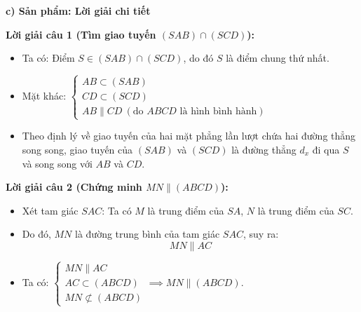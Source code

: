 \documentclass[12pt, a4paper]{article}
\begin{document}
\noindent \textbf{c) Sản phẩm: Lời giải chi tiết}

\noindent \textbf{Lời giải câu 1 (Tìm giao tuyến $(SAB) \cap (SCD)$):}
\begin{itemize}
    \item Ta có: Điểm $S \in (SAB) \cap (SCD)$, do đó $S$ là điểm chung thứ nhất.
    \item Mặt khác: $\begin{cases} AB \subset (SAB) \\ CD \subset (SCD) \\ AB \parallel CD \ (\text{do } ABCD \text{ là hình bình hành}) \end{cases}$
    \item Theo định lý về giao tuyến của hai mặt phẳng lần lượt chứa hai đường thẳng song song, giao tuyến của $(SAB)$ và $(SCD)$ là đường thẳng $d_x$ đi qua $S$ và song song với $AB$ và $CD$.
\end{itemize}

\noindent \textbf{Lời giải câu 2 (Chứng minh $MN \parallel (ABCD)$):}
\begin{itemize}
    \item Xét tam giác $SAC$: Ta có $M$ là trung điểm của $SA$, $N$ là trung điểm của $SC$.
    \item Do đó, $MN$ là đường trung bình của tam giác $SAC$, suy ra:
    $$MN \parallel AC$$
    \item Ta có: $\begin{cases} MN \parallel AC \\ AC \subset (ABCD) \\ MN \not\subset (ABCD) \end{cases} \implies MN \parallel (ABCD)$.
\end{itemize}
\end{document}

